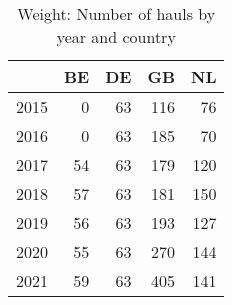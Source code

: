 \begin{table}[ht]
\centering
\begin{tabular}{rrrrr}
  \hline
 & BE & DE & GB & NL \\ 
  \hline
2015 & 0 & 63 & 116 & 76 \\ 
  2016 & 0 & 63 & 185 & 70 \\ 
  2017 & 54 & 63 & 179 & 120 \\ 
  2018 & 57 & 63 & 181 & 150 \\ 
  2019 & 56 & 63 & 193 & 127 \\ 
  2020 & 55 & 63 & 270 & 144 \\ 
  2021 & 59 & 63 & 405 & 141 \\ 
   \hline
\end{tabular}
\caption{Weight: Number of hauls by year and country} 
\end{table}
